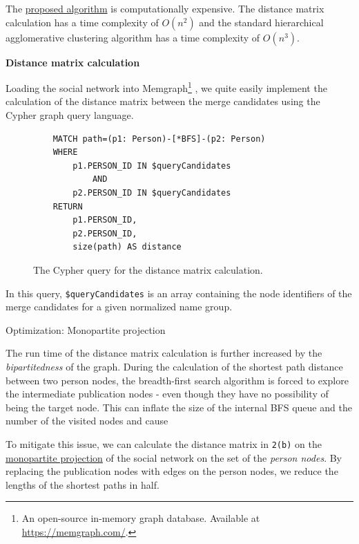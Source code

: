 The \hyperref[sec:distance-based-hierarchical-clustering]{proposed algorithm} 
is computationally expensive. The distance matrix calculation has a time complexity of $O(n^2)$
and the standard hierarchical agglomerative clustering algorithm has a time complexity of $O(n^3)$.

\textbf{Distance matrix calculation}

Loading the social network into Memgraph\footnote{An open-source in-memory graph database. Available at \url{https://memgraph.com/}.}
, we quite easily implement the calculation of the distance matrix between the merge candidates using the Cypher graph query language.

\begin{figure}[!ht]
\begin{verbatim}
    MATCH path=(p1: Person)-[*BFS]-(p2: Person)
    WHERE 
        p1.PERSON_ID IN $queryCandidates 
            AND 
        p2.PERSON_ID IN $queryCandidates
    RETURN 
        p1.PERSON_ID, 
        p2.PERSON_ID, 
        size(path) AS distance
\end{verbatim}
\captionsetup{width=.9\linewidth}
\caption{The Cypher query for the distance matrix calculation.\protect\footnotemark}
\end{figure}


In this query, \texttt{\$queryCandidates} is an array containing the node identifiers of the merge candidates for a given normalized name group.


\begin{mybox}
    {Optimization: Monopartite projection}

    The run time of the distance matrix calculation is further increased by the \textit{bipartitedness} of the graph.
    During the calculation of the shortest path distance between two person nodes, 
    the breadth-first search algorithm is forced to explore the intermediate publication nodes - even though they have no possibility of being the target node.
    This can inflate the size of the internal BFS queue and the number of the visited nodes and cause 
    
    To mitigate this issue, we can calculate the distance matrix in \texttt{2(b)} on the \hyperref[def:monopartite-projection]{monopartite projection} of the social network on 
    the set of the \textit{person nodes}. By replacing the publication nodes with edges on the person nodes, we reduce the lengths of the shortest paths in half.
\end{mybox}



